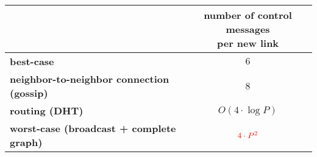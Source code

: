 \footnotesize

\begin{tabularx}{0.95\columnwidth}{@{}Xc@{}}
  & \makecell{number of control messages\\per new link} \\
  \hline\hline

  \textbf{best-case} & $6$ \\ 
  \textbf{neighbor-to-neighbor connection (gossip)} & $8$ \\ 
  \textbf{routing (DHT)} & $O(4 \cdot \log P)$  \\
  \textbf{worst-case (broadcast + complete graph)} & $\textcolor{red}{4 \cdot P^2}$ 
\end{tabularx}

